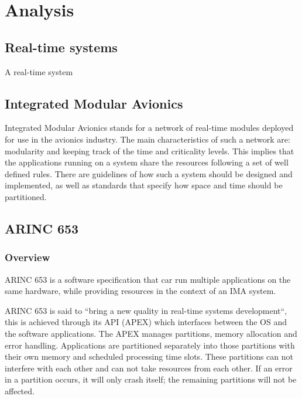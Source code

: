 
\chapter{Analysis}


\section{Real-time systems}

A real-time system 

\section{Integrated Modular Avionics}

Integrated Modular Avionics stands for a network of real-time modules deployed for use in the avionics industry. The main characteristics of such a network are: modularity and keeping track of the time and criticality levels. This implies that the applications running on a system share the resources following a set of well defined rules. There are guidelines of how such a system should be designed and implemented, as well as standards that specify how space and time should be partitioned.

\section{ARINC 653}
\subsection{Overview}

ARINC 653 is a software specification that car run multiple applications on the same hardware, while providing resources in the context of an IMA system.

ARINC 653 is said to “bring a new quality in real-time systems development“,
this is achieved through its API (APEX) which interfaces between the OS and the software applications.
The APEX manages partitions, memory allocation and error handling.
Applications are partitioned separately into those partitions with their own memory and scheduled processing time slots.
These partitions can not interfere with each other and can not take resources from each other.
If an error in a partition occurs, it will only crash itself; the remaining partitions will not be affected.

